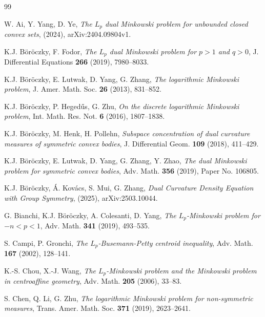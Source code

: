 \documentclass[12pt, reqno]{amsart}
\theoremstyle{definition}
\theoremstyle{remark}
\numberwithin{equation}{section}
\newcommand{\Lp}{L_{p}}
\begin{document}
		
	\begin{thebibliography}{99}
		
		W. Ai, Y. Yang, D. Ye, \emph{The $L_{p}$ dual Minkowski problem for unbounded closed convex sets}, (2024),
		arXiv:2404.09804v1.


K.J. B\"or\"oczky,		F. Fodor, \emph{The $\Lp$ dual Minkowski problem for $p>1$ and $q>0$}, J. Differential Equations \textbf{266}
		(2019), 7980--8033.
		
			K.J. B\"or\"oczky, E. Lutwak, D. Yang, G. Zhang,
			\emph{The logarithmic Minkowski problem},
			J. Amer. Math. Soc. \textbf{26} (2013), 831--852.
			
			K.J. B\"or\"oczky, P. Heged\H{u}s, G. Zhu, \emph{On the discrete logarithmic Minkowski problem},  Int. Math.
			Res. Not.  \textbf{6} (2016), 1807--1838.
			
				K.J. B\"or\"oczky, M. Henk, H. Pollehn, \emph{Subspace concentration of dual curvature measures of symmetric
			convex bodies}, J. Differential Geom. \textbf{109} (2018), 411--429.
			
			
		
			
			K.J. B\"or\"oczky, E. Lutwak, D. Yang, G. Zhang, Y. Zhao, \emph{The dual Minkowski problem for symmetric
			convex bodies}, Adv. Math. \textbf{356} (2019), Paper No. 106805.
			
			
			
			K.J. B\"or\"oczky, \'{A}. Kov\'{a}cs, S. Mui, G. Zhang, \emph{Dual Curvature Density Equation with Group Symmetry}, (2025), arXiv:2503.10044.
			
			G. Bianchi, K.J. B\"or\"oczky, A. Colesanti, D. Yang, \emph{The $\Lp$-Minkowski problem for $-n<p<1$}, Adv.
			Math. \textbf{341} (2019), 493--535.
			
			S. Campi, P. Gronchi, \emph{The $L_{p}$-Busemann-Petty centroid inequality}, Adv. Math. \textbf{167} (2002), 128--141.
			
			
			
			 K.-S. Chou, X.-J. Wang, \emph{The $\Lp$-Minkowski problem and the Minkowski problem in centroaffine
			geometry}, Adv. Math. \textbf{205} (2006), 33--83.
			
			
			
			
			
			S. Chen, Q. Li, G. Zhu, \emph{The logarithmic Minkowski problem for non-symmetric measures}, Trans.
			Amer. Math. Soc.    \textbf{371}  (2019), 2623--2641.
			

\end{thebibliography}
\end{document}
